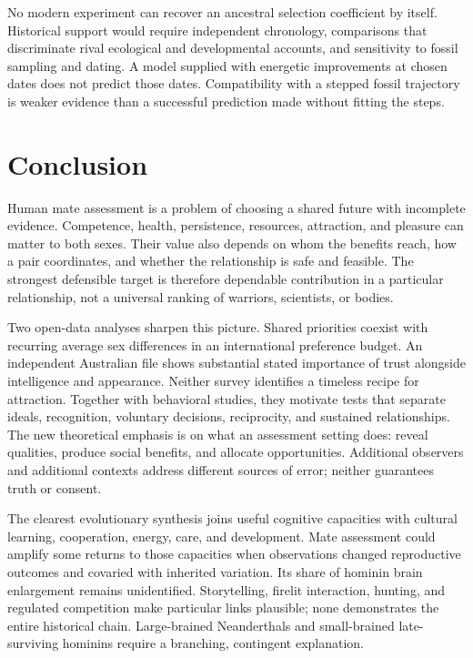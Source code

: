\documentclass[10pt,twocolumn,letterpaper]{article}
\begin{document}
No modern experiment can recover an ancestral selection coefficient by itself. Historical support would require independent chronology, comparisons that discriminate rival ecological and developmental accounts, and sensitivity to fossil sampling and dating. A model supplied with energetic improvements at chosen dates does not predict those dates. Compatibility with a stepped fossil trajectory is weaker evidence than a successful prediction made without fitting the steps.

\section{Conclusion}
Human mate assessment is a problem of choosing a shared future with incomplete evidence. Competence, health, persistence, resources, attraction, and pleasure can matter to both sexes. Their value also depends on whom the benefits reach, how a pair coordinates, and whether the relationship is safe and feasible. The strongest defensible target is therefore dependable contribution in a particular relationship, not a universal ranking of warriors, scientists, or bodies.

Two open-data analyses sharpen this picture. Shared priorities coexist with recurring average sex differences in an international preference budget. An independent Australian file shows substantial stated importance of trust alongside intelligence and appearance. Neither survey identifies a timeless recipe for attraction. Together with behavioral studies, they motivate tests that separate ideals, recognition, voluntary decisions, reciprocity, and sustained relationships. The new theoretical emphasis is on what an assessment setting does: reveal qualities, produce social benefits, and allocate opportunities. Additional observers and additional contexts address different sources of error; neither guarantees truth or consent.

The clearest evolutionary synthesis joins useful cognitive capacities with cultural learning, cooperation, energy, care, and development. Mate assessment could amplify some returns to those capacities when observations changed reproductive outcomes and covaried with inherited variation. Its share of hominin brain enlargement remains unidentified. Storytelling, firelit interaction, hunting, and regulated competition make particular links plausible; none demonstrates the entire historical chain. Large-brained Neanderthals and small-brained late-surviving hominins require a branching, contingent explanation.
\end{document}
